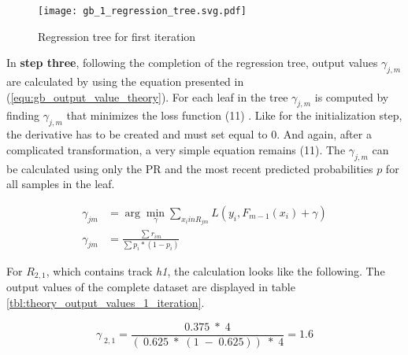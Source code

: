 \begin{figure}[H]
    \centering
    \caption[]{Regression tree for first iteration}
	\label{fig:gb_1_regression_tree}
    \texttt{[image: gb\_1\_regression\_tree.svg.pdf]}
\end{figure}

In \textbf{step three}, following the completion of the regression tree, output values \(\gamma_{j, m}\) are calculated by using 
the equation presented in (\ref{equ:gb_output_value_theory}). For each leaf in the tree \(\gamma_{j, m}\) is computed by finding 
\(\gamma_{j, m}\) that minimizes the loss function (11) \cite[p.361]{Hastie_2009}. Like for the initialization step, the derivative has 
to be created and must set equal to \(0\). And again, after a complicated transformation, a very simple 
equation remains (11). The \(\gamma_{j, m}\)  can be calculated using only the \ac{PR} and the most 
recent predicted probabilities \(p\) for all samples in the leaf. 

\begin{equation}
    \begin{aligned}
        \gamma_{jm} &= \arg \min_{\gamma}\sum_{x_{i} in R_{jm}} L(y_{i},F_{m-1}(x_{i}) + \gamma)
        \\
        \gamma_{jm} &= \frac{ \sum r_{im}}{\sum p_{i} * (1 - p_{i})}
        \label{equ:gb_output_value_theory}
    \end{aligned}
\end{equation}

For \(R_{2,1}\), which contains track \emph{h1}, the calculation looks like the following. The output values of the complete 
dataset are displayed in table \ref{tbl:theory_output_values_1_iteration}. 

\begin{equation*}
\gamma_{\;2,1} = \frac{0.375\;*\;4}{(\:0.625\;*\;(1\;-\;0.625))\;*\;4} = 1.6 
\end{equation*}

